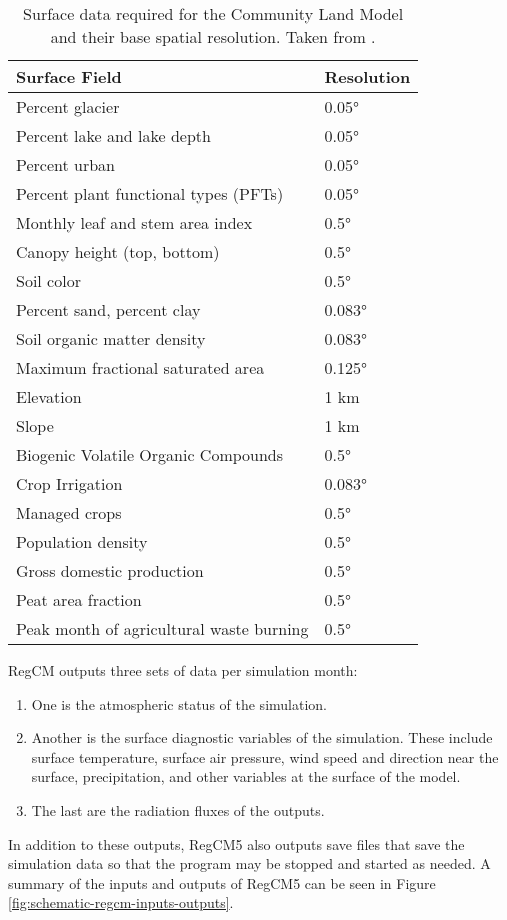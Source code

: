 		\begin{table}[]
			\caption{
				Surface data required for the Community Land Model and their base spatial resolution.
				Taken from \textcite{Oleson2013}.
			}
			\label{tab:surface-data-clm}
			\centering
			\begin{tabular}{ll}
				\hline \hline
				Surface Field & Resolution                      \\
				\hline
				Percent glacier & 0.05°                         \\
				Percent lake and lake depth & 0.05°             \\
				Percent urban & 0.05°                           \\
				Percent plant functional types (PFTs) & 0.05°   \\
				Monthly leaf and stem area index & 0.5°         \\
				Canopy height (top, bottom) & 0.5°              \\
				Soil color & 0.5°                               \\
				Percent sand, percent clay & 0.083°                           \\
				Soil organic matter density & 0.083°            \\
				Maximum fractional saturated area & 0.125°      \\
				Elevation & 1 km                                 \\
				Slope & 1 km                                     \\
				Biogenic Volatile Organic Compounds & 0.5°      \\
				Crop Irrigation & 0.083°                        \\
				Managed crops & 0.5°                            \\
				Population density & 0.5°                       \\
				Gross domestic production & 0.5°                \\
				Peat area fraction & 0.5°                       \\
				Peak month of agricultural waste burning & 0.5° \\
				\hline
			\end{tabular}
		\end{table}
	
		RegCM outputs three sets of data per simulation month:
		\begin{enumerate}
			\item One is the atmospheric status of the simulation.
			\item Another is the surface diagnostic variables of the simulation.
				These include surface temperature, surface air pressure, wind speed and direction near the surface, precipitation, and other variables at the surface of the model.
			\item The last are the radiation fluxes of the outputs.
		\end{enumerate}
		In addition to these outputs, RegCM5 also outputs save files that save the simulation data so that the program may be stopped and started as needed.
		A summary of the inputs and outputs of RegCM5 can be seen in Figure \ref{fig:schematic-regcm-inputs-outputs}.
	
